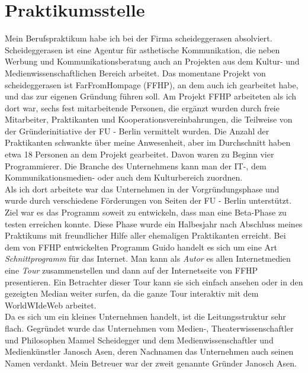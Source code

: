 \section{Praktikumsstelle}

Mein Berufspraktikum habe ich bei der Firma scheideggerasen absolviert. Scheideggerasen ist eine Agentur für asthetische Kommunikation, die neben Werbung und Kommunikationsberatung auch an Projekten aus dem Kultur- und Medienwissenschaftlichen Bereich arbeitet. Das momentane Projekt von scheideggerasen ist FarFromHompage (FFHP), an dem auch ich gearbeitet habe, und das zur eigenen Gründung führen soll. Am Projekt FFHP arbeiteten als ich dort war, sechs fest mitarbeitende Personen, die ergänzt wurden durch freie Mitarbeiter, Praktikanten und Kooperationsvereinbahrungen, die Teilweise von der Gründerinitiative der FU - Berlin vermittelt wurden. Die Anzahl der Praktikanten schwankte über meine Anwesenheit, aber im Durchschnitt haben etwa 18 Personen an dem Projekt gearbeitet. Davon waren zu Beginn vier Programmierer. Die Branche des Unternehmens kann man der IT-, dem Kommunikationsmedien- oder auch dem Kulturbereich zuordnen.\\
Als ich dort arbeitete war das Unternehmen in der Vorgründungsphase und wurde durch verschiedene Förderungen von Seiten der FU - Berlin unterstützt. Ziel war es das Programm soweit zu entwickeln, dass man eine Beta-Phase zu testen erreichen konnte. Diese Phase wurde ein Halbesjahr nach Abschluss meines Praktikums mit freundlicher Hilfe aller ehemaligen Praktikanten erreicht. Bei dem von FFHP entwickelten Programm Guido handelt es sich um eine Art \emph{Schnittprogramm} für das Internet. Man kann als \emph{Autor} es allen Internetmedien eine \emph{Tour} zusammenstellen und dann auf der Internetseite von FFHP presentieren. Ein Betrachter dieser Tour kann sie sich einfach ansehen oder in den gezeigten Median weiter surfen, da die ganze Tour interaktiv mit dem WorldWIdeWeb arbeitet.\\
Da es sich um ein kleines Unternehmen handelt, ist die Leitungsstruktur sehr flach. Gegründet wurde das Unternehmen vom Medien-, Theaterwissenschaftler und Philosophen Manuel Scheidegger und dem Medienwissenschaftler und Medienkünstler Janosch Asen, deren Nachnamen das Unternehmen auch seinen Namen verdankt. Mein Betreuer war der zweit genannte Gründer Janosch Asen.\\

